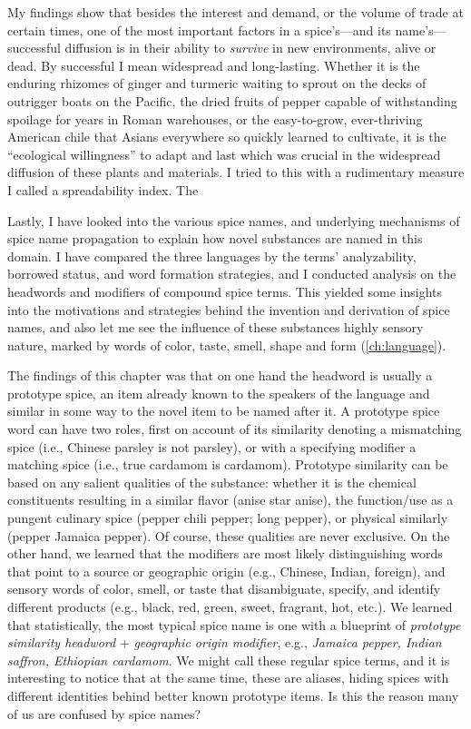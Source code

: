 My findings show that besides the interest and demand, or the volume of trade at certain times, one of the most important factors in a spice's---and its name's---successful diffusion is in their ability to \textit{survive} in new environments, alive or dead. By successful I mean widespread and long-lasting. Whether it is the enduring rhizomes of ginger and turmeric waiting to sprout on the decks of outrigger boats on the Pacific, the dried fruits of pepper capable of withstanding spoilage for years in Roman warehouses, or the easy-to-grow, ever-thriving American chile that Asians everywhere so quickly learned to cultivate, it is the ``ecological willingness'' to adapt and last which was crucial in the widespread diffusion of these plants and materials. I tried to this with a rudimentary measure I called a spreadability index. The 


Lastly, I have looked into the various spice names, and underlying mechanisms of spice name propagation to explain how novel substances are named in this domain. I have compared the three languages by the terms' analyzability, borrowed status, and word formation strategies, and I conducted analysis on the headwords and modifiers of compound spice terms. This yielded some insights into the motivations and strategies behind the invention and derivation of spice names, and also let me see the influence of these substances highly sensory nature, marked by words of color, taste, smell, shape and form (\cref{ch:language}). 

The findings of this chapter was that on one hand the headword is usually a prototype spice, an item already known to the speakers of the language and similar in some way to the novel item to be named after it. A prototype spice word can have two roles, first on account of its similarity denoting a mismatching spice (i.e., Chinese parsley is not parsley), or with a specifying modifier a matching spice (i.e., true cardamom is cardamom). Prototype similarity can be based on any salient qualities of the substance: whether it is the chemical constituents resulting in a similar flavor (anise \rightarrow star anise), the function/use as a pungent culinary spice (pepper \rightarrow chili pepper; long pepper), or physical similarly (pepper \rightarrow Jamaica pepper). Of course, these qualities are never exclusive. On the other hand, we learned that the modifiers are most likely distinguishing words that point to a source or geographic origin (e.g., Chinese, Indian, foreign), and sensory words of color, smell, or taste that disambiguate, specify, and identify different products (e.g., black, red, green, sweet, fragrant, hot, etc.). We learned that statistically, the most typical spice name is one with a blueprint of \textit{prototype similarity headword} + \textit{geographic origin modifier}, e.g., \textit{Jamaica pepper, Indian saffron, Ethiopian cardamom}. We might call these regular spice terms, and it is interesting to notice that at the same time, these are aliases, hiding spices with different identities behind better known prototype items. Is this the reason many of us are confused by spice names? 

